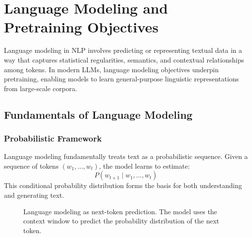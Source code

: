 \chapter{Language Modeling and Pretraining Objectives}
\label{chap:lm_pretraining}

\noindent
Language modeling in NLP involves predicting or representing textual data in a way that captures statistical regularities, semantics, and contextual relationships among tokens. In modern LLMs, language modeling objectives underpin pretraining, enabling models to learn general-purpose linguistic representations from large-scale corpora.

\section{Fundamentals of Language Modeling}
\label{sec:lm_fundamentals}

\subsection{Probabilistic Framework}
\noindent
Language modeling fundamentally treats text as a probabilistic sequence. Given a sequence of tokens \((w_1, \ldots, w_t)\), the model learns to estimate:
\[
P(w_{t+1} \mid w_1, \ldots, w_t)
\]
This conditional probability distribution forms the basis for both understanding and generating text.

\begin{figure}[ht]
    \centering
    \caption{Language modeling as next-token prediction. The model uses the context window to predict the probability distribution of the next token.}
    \label{fig:lm_prediction}
\end{figure}

